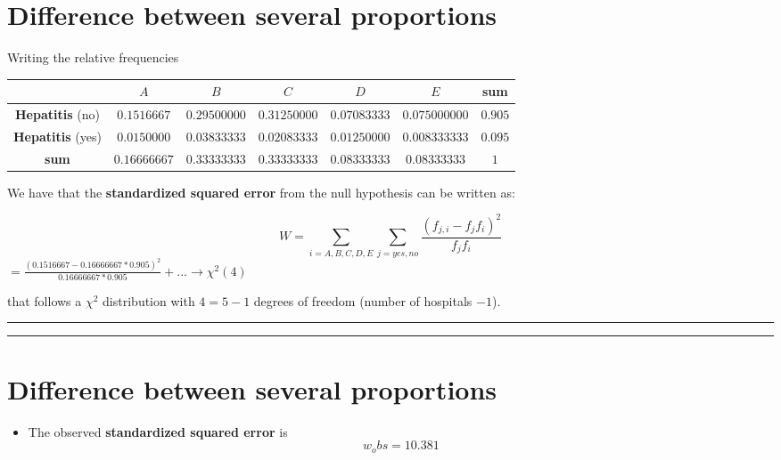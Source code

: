 \documentclass[
]{book}
\providecommand{\tightlist}{%
  \setlength{\itemsep}{0pt}\setlength{\parskip}{0pt}}
\begin{document}
\hypertarget{difference-between-several-proportions-1}{%
\section{Difference between several proportions}\label{difference-between-several-proportions-1}}

Writing the relative frequencies

\begin{longtable}[]{@{}ccccccc@{}}
\toprule
& \(A\) & \(B\) & \(C\) & \(D\) & \(E\) & sum \\
\midrule
\endhead
\textbf{Hepatitis} (no) & \(0.1516667\) & \(0.29500000\) & \(0.31250000\) & \(0.07083333\) & \(0.075000000\) & \(0.905\) \\
\textbf{Hepatitis} (yes) & \(0.0150000\) & \(0.03833333\) & \(0.02083333\) & \(0.01250000\) & \(0.008333333\) & \(0.095\) \\
\textbf{sum} & \(0.16666667\) & \(0.33333333\) & \(0.33333333\) & \(0.08333333\) & \(0.08333333\) & \(1\) \\
\bottomrule
\end{longtable}

We have that the \textbf{standardized squared error} from the null hypothesis can be written as:

\[W= \sum_{i=A,B,C,D,E} \sum_{j=yes,no} \frac{(f_{j,i}-f_{j}f_{i})^2}{f_{j}f_{i}}\]
\(= \frac{(0.1516667 - 0.16666667*0.905)^2}{0.16666667*0.905} + ... \rightarrow \chi^2(4)\)

that follows a \(\chi^2\) distribution with \(4=5-1\) degrees of freedom (number of hospitals \(-1\)).

\begin{center}\rule{0.5\linewidth}{0.5pt}\end{center}

\begin{center}\rule{0.5\linewidth}{0.5pt}\end{center}

\hypertarget{difference-between-several-proportions-2}{%
\section{Difference between several proportions}\label{difference-between-several-proportions-2}}

\begin{itemize}
\tightlist
\item
  The observed \textbf{standardized squared error} is
  \[w_obs=10.381\]
\end{itemize}
\end{document}
